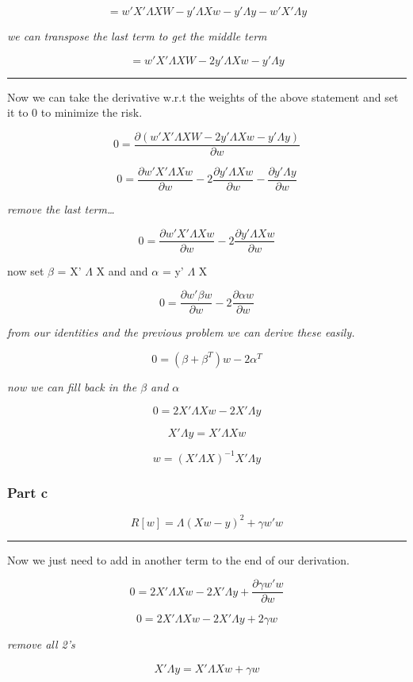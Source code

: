 \documentclass[11pt]{article}
\begin{document}
$$= w'X' \Lambda XW - y' \Lambda Xw - y' \Lambda y - w'X' \Lambda y$$

\emph{we can transpose the last term to get the middle term}

$$= w'X' \Lambda XW - 2y' \Lambda Xw - y' \Lambda y$$

\rule{\linewidth}{0.5pt}
Now we can take the derivative w.r.t the weights of the above statement and set it to 0 to minimize the risk.

$$ 0 = \dfrac{\partial (w'X' \Lambda XW - 2y' \Lambda Xw - y' \Lambda y)}{\partial w}$$

$$0 = \dfrac{ \partial w'X' \Lambda Xw}{\partial w} - 2 \dfrac{\partial y' \Lambda Xw}{\partial w} - \dfrac{ \partial y' \Lambda y}{\partial w}$$

\emph{remove the last term\ldots{}}

$$0 = \dfrac{ \partial w'X' \Lambda Xw}{\partial w} - 2 \dfrac{\partial y' \Lambda Xw}{\partial w}$$

now set $\beta$ = X' $\Lambda$ X and and $\alpha$ = y' $\Lambda$ X

$$0 = \dfrac{ \partial w' \beta w}{\partial w} - 2 \dfrac{\partial \alpha w}{\partial w}$$

\emph{from our identities and the previous problem we can derive these easily.}

$$0 = (\beta + \beta^T)w  - 2 \alpha^T$$

\emph{now we can fill back in the $\beta$ and $\alpha$}

$$0 = 2X' \Lambda Xw - 2X' \Lambda y$$

$$X' \Lambda y = X' \Lambda Xw$$

$$w = (X' \Lambda X)^{-1} X' \Lambda y$$

\subsubsection{Part c}
\label{sec-7-1-3}

$$R[w] = \Lambda (Xw - y)^2 + \gamma w'w$$

\rule{\linewidth}{0.5pt}

Now we just need to add in another term to the end of our derivation.

$$0 = 2X' \Lambda Xw - 2X' \Lambda y + \dfrac{\partial \gamma w'w}{\partial w}$$

$$0 = 2X' \Lambda Xw - 2X' \Lambda y + 2 \gamma w$$

\emph{remove all 2's}

$$X' \Lambda y = X' \Lambda Xw + \gamma w$$
\end{document}
